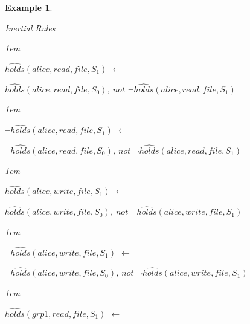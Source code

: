 \documentclass[11pt]{report}
\newtheorem{vexample}{Example}[chapter]
\newenvironment{vquote}
{
  \begin{list}{}{\leftmargin 1em}\item[]
}
{
  \end{list}
}
\begin{document}
\begin{vexample}
\begin{enumerate}
              \item
                Inertial Rules

                \begin{vquote}
                  $\hat{holds}(alice, read, file, S_{1})$ $\leftarrow$
    
                  \hspace{1em}
                  $\hat{holds}(alice, read, file, S_{0})$,
                  $not$ $\lnot\hat{holds}(alice, read, file, S_{1})$
                \end{vquote}
    
                \begin{vquote}
                  $\lnot\hat{holds}(alice, read, file, S_{1})$ $\leftarrow$
    
                  \hspace{1em}
                  $\lnot\hat{holds}(alice, read, file, S_{0})$,
                  $not$ $\lnot\hat{holds}(alice, read, file, S_{1})$
                \end{vquote}
    
                \begin{vquote}
                  $\hat{holds}(alice, write, file, S_{1})$ $\leftarrow$
    
                  \hspace{1em}
                  $\hat{holds}(alice, write, file, S_{0})$,
                  $not$ $\lnot\hat{holds}(alice, write, file, S_{1})$
                \end{vquote}
    
                \begin{vquote}
                  $\lnot\hat{holds}(alice, write, file, S_{1})$ $\leftarrow$
    
                  \hspace{1em}
                  $\lnot\hat{holds}(alice, write, file, S_{0})$,
                  $not$ $\lnot\hat{holds}(alice, write, file, S_{1})$
                \end{vquote}
    
                \begin{vquote}
                  $\hat{holds}(grp1, read, file, S_{1})$ $\leftarrow$
    

\end{vquote}
\end{enumerate}
\end{vexample}
\end{document}
